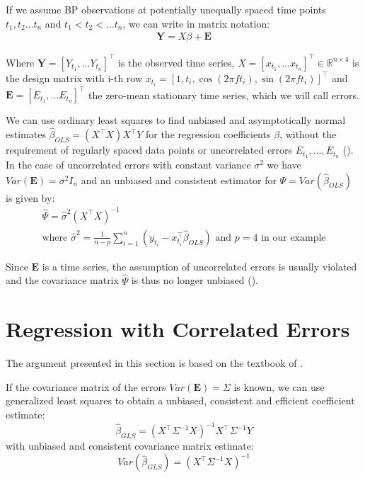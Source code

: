 If we assume BP observations at potentially unequally spaced
time points $t_1, t_2 \dots t_n$ and $t_1 < t_2 < \dots t_n$, we can write in matrix notation:
\begin{gather*}
\mathbf{Y} = X \beta + \mathbf{E}
\end{gather*}

Where $\mathbf{Y} = [Y_{t_1}, \dots Y_{t_n}]^{\top}$ is the observed time series,
$X = [x_{t_1}, \dots x_{t_n}]^{\top} \in \mathbb{R}^{n \times 4}$ is the design matrix with i-th row
$x_{t_i} = [1, t_i, \cos(2 \pi f t_i), \sin(2 \pi f t_i)]^{\top}$
and $\mathbf{E} = [E_{t_1}, \dots E_{t_n}]^{\top}$ the zero-mean stationary time series,
which we will call errors.

We can use ordinary least squares to find unbiased and asymptotically normal estimates $\hat{\beta}_{OLS} = (X^{\top}X) X^{\top}Y$
for the regression coefficients $\beta$, without the requirement of regularly spaced data points or uncorrelated errors
$E_{t_1}, \dots, E_{t_n}$ (\citeauthor{white_asymptotic_2001}).
In the case of uncorrelated errors with constant variance $\sigma^2$ we have
$Var(\mathbf{E}) = \sigma^2 I_n$ and an unbiased and consistent estimator for $\Psi = Var(\hat{\beta}_{OLS})$ is given by:
\begin{gather*}
\hat{\Psi} = \hat{\sigma}^2(X^{\top}X)^{-1} \\
    \text{where $\hat{\sigma}^2=\frac{1}{n-p} \sum_{i = 1}^{n} (y_{t_i} - x_{t_i}^{\top} \hat{\beta}_{OLS})$ and $p=4$ in our example}
\end{gather*}

Since $\mathbf{E}$ is a time series, the assumption of uncorrelated errors is usually violated and the
covariance matrix $\hat{\Psi}$ is thus no longer unbiased (\citeauthor{brockwell_introduction_2016}).

\section{Regression with Correlated Errors}

The argument presented in this section is based on the textbook of \citeauthor{brockwell_introduction_2016}.

If the covariance matrix of the errors $Var(\mathbf{E}) = \Sigma$ is known,
we can use generalized least squares to obtain a unbiased, consistent and efficient coefficient estimate:
\[\hat{\beta}_{GLS} = (X^{\top} \Sigma^{-1} X)^{-1} X^{\top} \Sigma^{-1} Y\]
with unbiased and consistent covariance matrix estimate:
\[Var(\hat{\beta}_{GLS}) = (X^{\top} \Sigma^{-1} X)^{-1}\]

